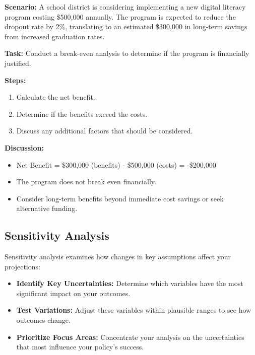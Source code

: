 \documentclass{article}
\theoremstyle{definition}
\theoremstyle{plain}
\begin{document}
\begin{tcolorbox}[colback=yellow!5!white, colframe=yellow!75!black, title=Exercise: Break-Even Analysis]
\textbf{Scenario:} A school district is considering implementing a new digital literacy program costing \$500,000 annually. The program is expected to reduce the dropout rate by 2\%, translating to an estimated \$300,000 in long-term savings from increased graduation rates.

\textbf{Task:} Conduct a break-even analysis to determine if the program is financially justified.

\textbf{Steps:}
\begin{enumerate}[label=\alph*.]
    \item Calculate the net benefit.
    \item Determine if the benefits exceed the costs.
    \item Discuss any additional factors that should be considered.
\end{enumerate}

\textbf{Discussion:} 
\begin{itemize}
    \item Net Benefit = \$300,000 (benefits) - \$500,000 (costs) = -\$200,000
    \item The program does not break even financially.
    \item Consider long-term benefits beyond immediate cost savings or seek alternative funding.
\end{itemize}
\end{tcolorbox}

\subsection{Sensitivity Analysis}

Sensitivity analysis examines how changes in key assumptions affect your projections:

\begin{itemize}
    \item \textbf{Identify Key Uncertainties:} Determine which variables have the most significant impact on your outcomes.
    \item \textbf{Test Variations:} Adjust these variables within plausible ranges to see how outcomes change.
    \item \textbf{Prioritize Focus Areas:} Concentrate your analysis on the uncertainties that most influence your policy's success.
\end{itemize}
\end{document}
